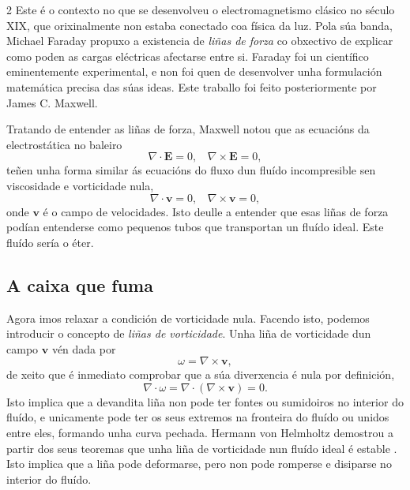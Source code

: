 \begin{multicols}{2}
Este é o contexto no que se desenvolveu o electromagnetismo clásico no século
XIX, que orixinalmente non estaba conectado coa física da luz. Pola súa banda,
Michael Faraday propuxo a existencia de \textit{liñas de forza} co obxectivo de
explicar como poden as cargas eléctricas afectarse entre si. Faraday foi un
científico eminentemente experimental, e non foi quen de desenvolver unha
formulación matemática precisa das súas ideas. Este traballo foi feito
posteriormente por James C. Maxwell.

Tratando de entender as liñas de forza, Maxwell notou que as ecuacións da
electrostática no baleiro
%
\begin{equation}
    \nabla \cdot \textbf{E} = 0, ~~~~ \nabla \times \textbf{E} = 0,
\end{equation}
%
teñen unha forma similar ás ecuacións do fluxo dun fluído incompresible sen
viscosidade e vorticidade nula,
%
\begin{equation}
    \nabla \cdot \textbf{v} = 0, ~~~~ \nabla \times \textbf{v} = 0,
\end{equation}
%
onde $\textbf{v}$ é o campo de velocidades. Isto deulle a entender que esas
liñas de forza podían entenderse como pequenos tubos que transportan un fluído
ideal. Este fluído sería o éter.

\subsection*{A caixa que fuma}

Agora imos relaxar a condición de vorticidade nula. Facendo isto, podemos
introducir o concepto de \textit{liñas de vorticidade}. Unha liña de
vorticidade dun campo $\textbf{v}$ vén dada por
%
\begin{equation}
    \omega = \nabla \times \textbf{v},
\end{equation}
%
de xeito que é inmediato comprobar que a súa diverxencia é nula por definición,
%
\begin{equation}
    \nabla \cdot \omega = \nabla \cdot (\nabla \times \textbf{v}) = 0.
\end{equation}
%
Isto implica que a devandita liña non pode ter fontes ou sumidoiros no interior do
fluído, e unicamente pode ter os seus extremos na fronteira do fluído ou unidos
entre eles, formando unha curva pechada. Hermann von Helmholtz demostrou a
partir dos seus teoremas que unha liña de vorticidade nun fluído ideal é
estable \cite{Helmholtz}. Isto implica que a liña pode deformarse, pero non
pode romperse e disiparse no interior do fluído.


\end{multicols}
